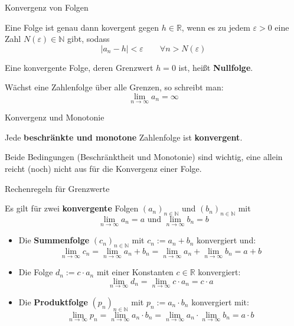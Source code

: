 \begin{frame}{Konvergenz von Folgen}
	\begin{theorem}
		Eine Folge ist genau dann kovergent gegen $h \in \mathbb{R}$, wenn es zu jedem $\varepsilon > 0$ eine Zahl $N(\varepsilon) \in \mathbb{N}$ gibt, sodass
		\[
			\left| a_{n} - h \right| < \varepsilon \qquad \forall n > N(\varepsilon)
		\]  
	\end{theorem}
	\begin{bemerkung}
		Eine konvergente Folge, deren Grenzwert $h = 0$ ist, heißt \textbf{Nullfolge}.
		
		Wächst eine Zahlenfolge über alle Grenzen, so schreibt man:
		\[
		\lim_{n \to \infty} a_{n} = \infty
		\]
	\end{bemerkung}
\end{frame}

\begin{frame}{Konvergenz und Monotonie}
	\begin{theorem}
		Jede \textbf{beschränkte und monotone} Zahlenfolge ist \textbf{konvergent}.
	\end{theorem}
	\begin{bemerkung}
		Beide Bedingungen (Beschränktheit und Monotonie) sind wichtig, eine allein reicht (noch) nicht aus für die Konvergenz einer Folge.
	\end{bemerkung}
\end{frame}

\begin{frame}{Rechenregeln für Grenzwerte}
	\begin{theorem}
		Es gilt für zwei \textbf{konvergente} Folgen $(a_{n})_{n \in \mathbb{N}}$ und $(b_{n})_{n \in \mathbb{N}}$ mit 
		\[
		\lim_{n \to \infty} a_{n} = a \mbox{  und  } \lim_{n \to \infty} b_{n} = b
		\] 
		\begin{itemize}
			\item Die \textbf{Summenfolge} $(c_{n})_{n \in \mathbb{N}}$ mit $c_{n} := a_{n} + b_{n}$ konvergiert und:
			\[
			\lim_{n \to \infty} c_{n} = \lim_{n \to \infty} a_{n} + b_{n} = \lim_{n \to \infty} a_{n} + \lim_{n \to \infty} b_{n} = a + b
			\]
			\item Die Folge $d_{n} := c \cdot a_{n}$ mit einer Konstanten $c \in \mathbb{R}$  konvergiert:
			\[
			\lim_{n \to \infty} d_{n} = \lim_{n \to \infty} c \cdot a_{n} = c \cdot a
			\]
			\item Die \textbf{Produktfolge} $(p_{n})_{n \in \mathbb{N}}$ mit $p_{n} := a_{n} \cdot b_{n}$ konvergiert mit:
			\[
			\lim_{n \to \infty} p_{n} = \lim_{n \to \infty} a_{n} \cdot b_{n} = \lim_{n \to \infty} a_{n} \cdot \lim_{n \to \infty} b_{n} = a \cdot b
			\]
		\end{itemize}
	\end{theorem}
\end{frame}

